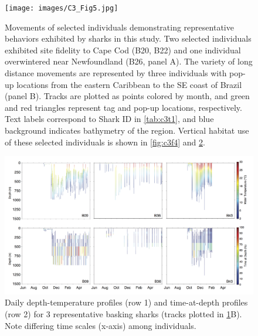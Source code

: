 \begin{figure}[t!]
\centering
\texttt{[image: images/C3\_Fig5.jpg]}
\caption[Representat]{Movements of selected individuals demonstrating representative behaviors exhibited by sharks in this study. Two selected individuals exhibited site fidelity to Cape Cod (B20, B22) and one individual overwintered near Newfoundland (B26, panel A). The variety of long distance movements are represented by three individuals with pop-up locations from the eastern Caribbean to the SE coast of Brazil (panel B). Tracks are plotted as points colored by month, and green and red triangles represent tag and pop-up locations, respectively. Text labels correspond to Shark ID in \cref{tab:c3t1}, and blue background indicates bathymetry of the region. Vertical habitat use of these selected individuals is shown in \cref{fig:c3f4} and \cref{fig:c3f6}. }
\label{fig:c3f5}
\end{figure}

\begin{figure}[t!]
\centering
\includegraphics[width=1\textwidth]{images/C3_Fig6.jpg}
\caption[Representative basking shark vertical data for long-range movements]{Daily depth-temperature profiles (row 1) and time-at-depth profiles (row 2) for 3 representative basking sharks (tracks plotted in \cref{fig:c3f5}B). Note differing time scales (x-axis) among individuals.}
\label{fig:c3f6}
\end{figure}

